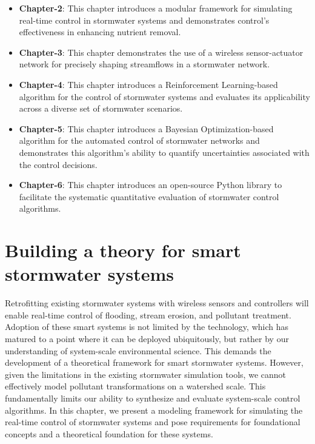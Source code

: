 \begin{itemize}
	\item \textbf{Chapter-2}: This chapter introduces a modular framework for simulating real-time control in stormwater systems and demonstrates control's effectiveness in enhancing nutrient removal.
	\item \textbf{Chapter-3}: This chapter demonstrates the use of a wireless sensor-actuator network for precisely shaping streamflows in a stormwater network.
	\item \textbf{Chapter-4}: This chapter introduces a Reinforcement Learning-based algorithm for the control of stormwater systems and evaluates its applicability across a diverse set of stormwater scenarios.
	\item \textbf{Chapter-5}: This chapter introduces a Bayesian Optimization-based algorithm for the automated control of stormwater networks and demonstrates this algorithm's ability to quantify uncertainties associated with the control decisions. 
	\item \textbf{Chapter-6}: This chapter introduces an open-source Python library to facilitate the systematic quantitative evaluation of stormwater control algorithms.
\end{itemize}
 

\section{Building a theory for smart stormwater systems}

Retrofitting existing stormwater systems with wireless sensors and controllers will enable real-time control of flooding, stream erosion, and pollutant treatment. 
Adoption of these smart systems is not limited by the technology, which has matured to a point where it can be deployed ubiquitously, but rather by our understanding of system-scale environmental science.
This demands the development of a theoretical framework for smart stormwater systems.
However, given the limitations in the existing stormwater simulation tools, we cannot effectively model pollutant transformations on a watershed scale.
This fundamentally limits our ability to synthesize and evaluate system-scale control algorithms. 
In this chapter, we present a modeling framework for simulating the real-time control of stormwater systems and pose requirements for foundational concepts and a theoretical foundation for these systems. 

\

